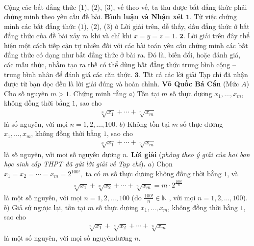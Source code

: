 \begin{multicols}{2}
\begin{align*}
	\end{align*}
	Cộng các bất đẳng thức ($1$), ($2$), ($3$), vế theo vế, ta thu được bất đẳng thức phải chứng minh theo yêu cầu đề bài.
	\vskip 0.05cm
	\textbf{\color{thachthuctoanhoc}Bình luận và Nhận xét}
	\vskip 0.05cm
	$\pmb{1.}$ Từ việc chứng minh các bất đẳng thức ($1$), ($2$), ($3$) ở Lời giải trên, dễ thấy, dấu đẳng thức ở bất đẳng thức của đề bài xảy ra khi và chỉ khi $x = y = z = 1$.
	\vskip 0.05cm
	$\pmb{2.}$ Lời giải trên đây thể hiện một cách tiếp cận tự nhiên đối với các bài toán yêu cầu chứng minh các bất đẳng thức có dạng như bất đẳng thức ở bài ra. Đó là, biến đổi, hoặc đánh giá, các mẫu thức, nhằm tạo ra thế có thể dùng bất đẳng thức trung bình cộng -- trung bình nhân để đánh giá các căn thức.
	\vskip 0.05cm
	$\pmb{3.}$ Tất cả các lời giải Tạp chí đã nhận được từ bạn đọc đều là lời giải đúng và hoàn chỉnh.
	\vskip 0.1cm
	\hfill	\textbf{\color{thachthuctoanhoc}Võ Quốc Bá Cẩn}
	\vskip 0.1cm
	{}
	(Mức $A$) Cho số nguyên $m>1$. Chứng minh rằng
	\vskip 0.05cm
	$a)$ Tồn tại $m$ số thực dương $x_1,\ldots,x_m$, không đồng thời bằng $1$, sao cho
	\begin{align*}
		\sqrt[n]{x_1}+\cdots+\sqrt[n]{x_m}
	\end{align*}
	là số nguyên, với mọi $n=1,2,\ldots,100$.
	\vskip 0.05cm
	$b)$ Không tồn  tại $m$ số thực dương $x_1,\ldots,x_m$, không đồng thời bằng $1$, sao cho
	\begin{align*}
		\sqrt[n]{x_1}+\cdots+\sqrt[n]{x_m}
	\end{align*}
	là số nguyên, với mọi số nguyên dương $n$.
	\vskip 0.05cm
	\textbf{\color{thachthuctoanhoc}Lời giải} (\textit{phỏng theo ý giải của hai bạn học sinh cấp THPT đã gửi lời giải về Tạp chí})\textbf{\color{thachthuctoanhoc}.}
	\vskip 0.05cm
	$a)$ Chọn ${x_1} = {x_2} =  \cdots  = {x_m} = {2^{100!}},$  ta có $m$ số thực dương không đồng thời bằng $1$, và
	\begin{align*}
		\sqrt[n]{{{x_1}}} + \sqrt[n]{{{x_2}}} +  \cdots  + \sqrt[n]{{{x_m}}} = m \cdot {2^{\frac{{100!}}{n}}}
	\end{align*}
	là một số nguyên, với mọi $n = 1, 2, \ldots, 100$ (do $\frac{{100!}}{n} \in \mathbb{N}$ , với mọi $n = 1, 2, \ldots, 100$).
	\vskip 0.05cm
	$b)$ Giả sử ngược lại, tồn tại $m$ số thực dương  $x_1, \ldots,x_m$, không đồng thời bằng $1$, sao cho
	\begin{align*}
		\sqrt[n]{{{x_1}}} + \sqrt[n]{{{x_2}}} +  \cdots  + \sqrt[n]{{{x_m}}}
	\end{align*}
	là một số nguyên, với mọi số nguyên\linebreak dương $n$.

\end{multicols}
